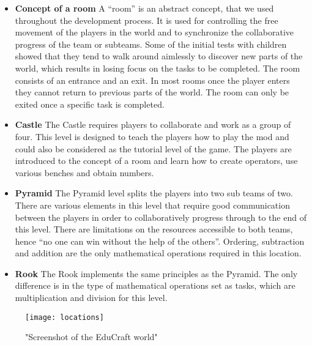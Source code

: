 \begin{itemize}
\item \textbf{Concept of a room}\newline
A “room” is an abstract concept, that we used throughout the development process. It is used for controlling the free movement of the players in the world and to synchronize the collaborative progress of the team or subteams. Some of the initial tests with children showed that they tend to walk around aimlessly to discover new parts of the world, which results in losing focus on the tasks to be completed.
The room consists of an entrance and an exit. In most rooms once the player enters they cannot return to previous parts of the world. The room can only be exited once a specific task is completed.

\item \textbf{Castle}\newline
The Castle requires players to collaborate and work as a group of four. This level is designed to teach the players how to play the mod and could also be considered as the tutorial level of the game. The players are introduced to the concept of a room and learn how to create operators, use various benches and obtain numbers.

\item \textbf{Pyramid}\newline
The Pyramid level splits the players into two sub teams of two. There are various elements in this level that require good communication between the players in order to collaboratively progress through to the end of this level. There are limitations on the resources accessible to both teams, hence ``no one can win without the help of the others''. Ordering, subtraction and addition are the only mathematical operations required in this location.

\item \textbf{Rook}\newline
The Rook implements the same principles as the Pyramid. The only difference is in the type of mathematical operations set as tasks, which are multiplication and division for this level.\newline
\end{itemize}
\begin{figure}[H]
\centering
\texttt{[image: locations]}
\caption{"Screenshot of the EduCraft world"}
\end{figure}